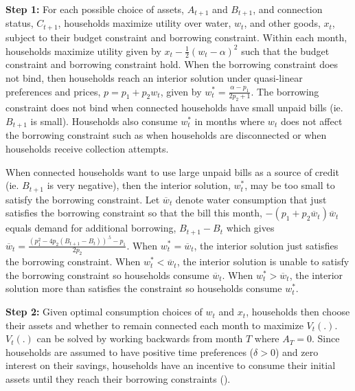 \documentclass[12pt]{article}
\begin{document}


\textbf{Step 1:} For each possible choice of assets, $A_{t+1}$ and $B_{t+1}$, and connection status, $C_{t+1}$, households maximize utility over water, $w_t$, and other goods, $x_t$, subject to their budget constraint and borrowing constraint.  Within each month, households maximize utility given by $ x_t -  \frac{1}{2} (w_t - \alpha)^2 $ such that the budget constraint and borrowing constraint hold.  When the borrowing constraint does not bind, then households reach an interior solution under quasi-linear preferences and prices, $p=p_1+p_2w_t$, given by $w_t^{*} =  \frac{ \alpha - p_1}{2p_2 + 1}$.  The borrowing constraint does not bind when connected households have small unpaid bills (ie. $B_{t+1}$ is small).  Households also consume $w_t^{*}$ in months where $w_t$ does not affect the borrowing constraint such as when households are disconnected or when households receive collection attempts.

When connected households want to use large unpaid bills as a source of credit (ie. $B_{t+1}$ is very negative), then the  interior solution, $w_t^{*}$, may be too small to satisfy the borrowing constraint.  Let $\overline{w}_t$ denote water consumption that just satisfies the borrowing constraint so that the bill this month, $-(p_1 +p_2\overline{w}_t)\overline{w}_t$ equals demand for additional borrowing, $B_{t+1}-B_{t}$ which gives $\overline{w}_t = \frac{(p_1^2 - 4p_2 (B_{t+1}-B_{t}))^{.5} - p_1}{2 p_2}$.  When $w_t^{*}=\overline{w}_t$, the interior solution just satisfies the borrowing constraint.  When $w_t^{*}<\overline{w}_t$, the interior solution is unable to satisfy the borrowing constraint so households consume $\overline{w}_t$.  When $w_t^{*}>\overline{w}_t$, the  interior solution more than satisfies the constraint so households consume $w_t^{*}$.

\textbf{Step 2:}  Given optimal consumption choices of $w_t$ and $x_t$, households then choose their assets and whether to remain connected each month to maximize $V_t(.)$.  $V_t(.)$ can be solved by working backwards from month $T$ where $A_T = 0$.  Since households are assumed to have positive time preferences ($\delta>0$) and zero interest on their savings, households have an incentive to consume their initial assets until they reach their borrowing constraints (\cite{deaton1991saving}).  
\end{document}

